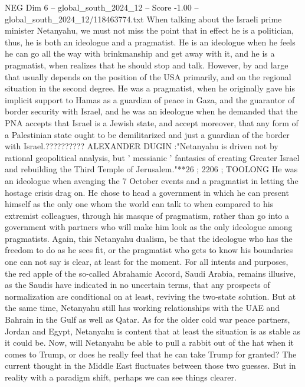 \begin{textsample}{NEG Dim 6 – global\_south\_2024\_12 – Score -1.00 – global\_south\_2024\_12/118463774.txt}  \label{ex:f6_neg_022}
When talking about the Israeli prime minister Netanyahu, we must not miss the point that in effect he is a politician, thus, he is both an ideologue and a pragmatist.
He is an ideologue when he feels he can go all the way with brinkmanship and get away with it, and he is a pragmatist, when realizes that he should stop and talk.
However, by and large that usually depends on the position of the USA primarily, and on the regional situation in the second degree.
He was a pragmatist, when he originally gave his implicit support to Hamas as a guardian of peace in Gaza, and the guarantor of border security with Israel, and he was an ideologue when he demanded that the PNA accepts that Israel is a Jewish state, and accept moreover, that any form of a Palestinian state ought to be demilitarized and just a guardian of the border with Israel.??????????
ALEXANDER DUGIN :"Netanyahu is driven not by rational geopolitical analysis, but ' messianic ' fantasies of creating Greater Israel and rebuilding the Third Temple of Jerusalem."**26 ; 2206 ; TOOLONG He was an ideologue when avenging the 7 October events and a pragmatist in letting the hostage crisis drag on.
He chose to head a government in which he can present himself as the only one whom the world can talk to when compared to his extremist colleagues, through his masque of pragmatism, rather than go into a government with partners who will make him look as the only ideologue among pragmatists.
Again, this Netanyahu dualism, be that the ideologue who has the freedom to do as he sees fit, or the pragmatist who gets to know his boundaries one can not say is clear, at least for the moment.
For all intents and purposes, the red apple of the so-called Abrahamic Accord, Saudi Arabia, remains illusive, as the Saudis have indicated in no uncertain terms, that any prospects of normalization are conditional on at least, reviving the two-state solution.
But at the same time, Netanyahu still has working relationships with the UAE and Bahrain in the Gulf as well as Qatar.
As for the older cold war peace partners, Jordan and Egypt, Netanyahu is content that at least the situation is as stable as it could be.
Now, will Netanyahu be able to pull a rabbit out of the hat when it comes to Trump, or does he really feel that he can take Trump for granted?
The current thought in the Middle East fluctuates between those two guesses.
But in reality with a paradigm shift, perhaps we can see things clearer.

\end{textsample}
